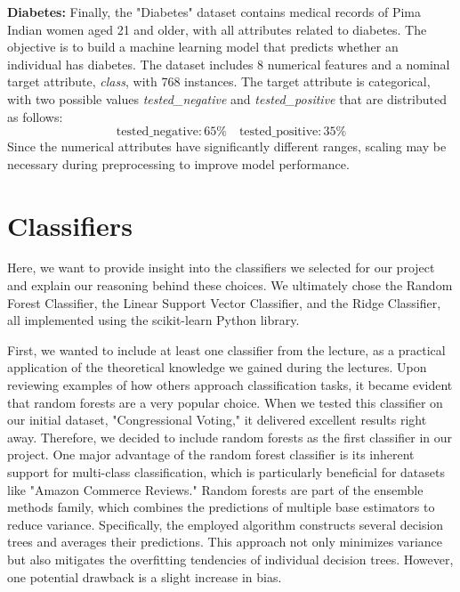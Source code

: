 \documentclass[a4paper,10pt]{article}
\begin{document}
\textbf{Diabetes:} Finally, the "Diabetes" dataset contains medical records of Pima Indian women aged 21 and older, with all attributes related to diabetes. The objective is to build a machine learning model that predicts whether an individual has diabetes. The dataset includes 8 numerical features and a nominal target attribute, \emph{class}, with 768 instances. The target attribute is categorical, with two possible values \emph{tested\_negative} and \emph{tested\_positive} that are distributed as follows:
\begin{equation*}
    \text{tested\_negative:} \,65\% \quad \text{tested\_positive:}\,35\%
\end{equation*} 
Since the numerical attributes have significantly different ranges, scaling may be necessary during preprocessing to improve model performance.

\section{Classifiers}

Here, we want to provide insight into the classifiers we selected for our project and explain our reasoning behind these choices. We ultimately chose the Random Forest Classifier, the Linear Support Vector Classifier, and the Ridge Classifier, all implemented using the scikit-learn Python library.

First, we wanted to include at least one classifier from the lecture, as a practical application of the theoretical knowledge we gained during the lectures. Upon reviewing examples of how others approach classification tasks, it became evident that random forests are a very popular choice. When we tested this classifier on our initial dataset, "Congressional Voting," it delivered excellent results right away. Therefore, we decided to include random forests as the first classifier in our project. One major advantage of the random forest classifier is its inherent support for multi-class classification, which is particularly beneficial for datasets like "Amazon Commerce Reviews." Random forests are part of the ensemble methods family, which combines the predictions of multiple base estimators to reduce variance. Specifically, the employed algorithm constructs several decision trees and averages their predictions. This approach not only minimizes variance but also mitigates the overfitting tendencies of individual decision trees. However, one potential drawback is a slight increase in bias.
\end{document}
